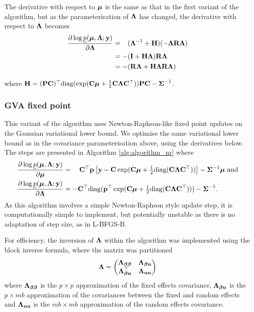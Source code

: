 \documentclass{amsart}[12pt]
\begin{document}
			\noindent The derivative with respect to ${\boldsymbol \mu}$ is the same as that in the first variant of the algorithm, but 
			as the parameterisation of ${\boldsymbol \Lambda}$ has changed, the  derivative with respect to ${\boldsymbol \Lambda}$ becomes
			\begin{align*}
				\frac{\partial \log \underline{p}({\boldsymbol \mu}, {\boldsymbol \Lambda}; {\bf y})}{\partial {\boldsymbol\Lambda}}
				  & = \hphantom{-}({\boldsymbol \Lambda}^{-1} + {\bf H})(-{\boldsymbol \Lambda} {\bf R} {\boldsymbol \Lambda}) \\
				  & = -({\bf I} + {\bf H}{\boldsymbol \Lambda}){\bf R}{\boldsymbol \Lambda}                           \\
				  & = - ({\bf R}{\boldsymbol \Lambda} + {\bf H}{\boldsymbol \Lambda}{\bf R}{\boldsymbol \Lambda})                  
			\end{align*} 
					
			\noindent where ${\bf H} = ({\bf P} {\bf C})^\top \text{diag}(\exp({\bf C} {\boldsymbol \mu} + \tfrac{1}{2} {\bf C} {\boldsymbol \Lambda} {\bf C}^\top)) {\bf P} {\bf C} - {\boldsymbol \Sigma}^{-1}$.
					
			\subsubsection{GVA fixed point}
					
					
			This variant of the algorithm uses Newton-Raphson-like fixed point updates on the Gaussian variational lower
			bound. We optimise the same variational lower bound as in the covariance parameterisation above, using the
			derivatives below. The steps are presented in Algorithm \ref{alg:algorithm_nr} where	
			\begin{align*}
				\frac{\partial \log \underline{p}({\boldsymbol \mu}, {\boldsymbol \Lambda}; {\bf y})}{\partial {\boldsymbol\mu}}     & = \quad {\bf C}^\top{\bf p} \left [{\bf y} - {\bf C}\exp({\bf C} {\boldsymbol \mu} + \tfrac{1}{2} \text{diag}({\bf C} {\boldsymbol \Lambda} {\bf C}^\top)) \right ] - {\boldsymbol \Sigma}^{-1} {\boldsymbol \mu} \text{ and} \\
				\frac{\partial \log \underline{p}({\boldsymbol \mu}, {\boldsymbol \Lambda}; {\bf y})}{\partial {\boldsymbol\Lambda}} & = -{\bf C}^\top \text{diag}({\bf p}^\top \exp({\bf C} {\boldsymbol \mu} +\tfrac{1}{2} \text{diag}({\bf C} {\boldsymbol \Lambda} {\bf C}^\top))) - {\boldsymbol \Sigma}^{-1}.                             
			\end{align*}
			As this algorithm involves a simple Newton-Raphson style update step, it is computationally simple to
			implement, but potentially unstable as there is no adaptation of step size, as in L-BFGS-B.

			For efficiency, the inversion of ${\boldsymbol \Lambda}$ within the algorithm was implemented using the block inverse 
			formula, where	the matrix was partitioned
			\[
				{\boldsymbol \Lambda} =
				\begin{pmatrix}
					{\boldsymbol\Lambda}_{{\boldsymbol \beta} {\boldsymbol \beta}} & {\boldsymbol \Lambda}_{{\boldsymbol \beta} {\bf u}} \\
					{\boldsymbol \Lambda}_{{\boldsymbol \beta} {\bf u}}^\top & {\boldsymbol \Lambda}_{{\bf u} {\bf u}}
				\end{pmatrix}
			\]
			where ${\boldsymbol \Lambda}_{{\boldsymbol \beta} {\boldsymbol \beta}}$ is the $p \times p$ approximation of the fixed effects covariance, ${\boldsymbol \Lambda}_{{\boldsymbol \beta} {\bf u}}$ is the $p \times mb$
			approximation of the covariances between the fixed and random effects and ${\boldsymbol \Lambda}_{{\bf u} {\bf u}}$ is the $mb \times mb$
			approximation of the random effects covariance.
\end{document}
